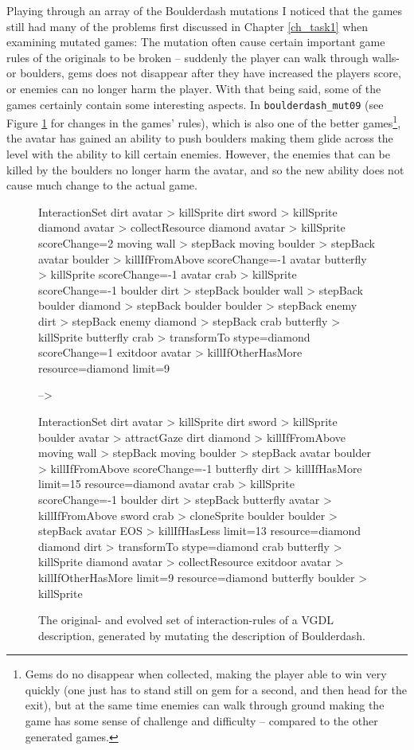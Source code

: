 \documentclass[a4paper,titlepage,final]{report}
\begin{document}
Playing through an array of the Boulderdash mutations I noticed that the games still had many of the problems first discussed in Chapter \ref{ch_task1} when examining mutated games:
The mutation often cause certain important game rules of the originals to be broken -- suddenly the player can walk through walls- or boulders, gems does not disappear after they have increased the players score, or enemies can no longer harm the player.
With that being said, some of the games certainly contain some interesting aspects.
In \texttt{boulderdash_mut09} (see Figure \ref{fig:evolved_boulderdash} for changes in the games' rules), which is also one of the better games\footnote{Gems do no disappear when collected, making the player able to win very quickly (one just has to stand still on gem for a second, and then head for the exit), but at the same time enemies can walk through ground making the game has some sense of challenge and difficulty -- compared to the other generated games.}, the avatar has gained an ability to push boulders making them glide across the level with the ability to kill certain enemies.
However, the enemies that can be killed by the boulders no longer harm the avatar, and so the new ability does not cause much change to the actual game.

\begin{figure}[!ht]
\centering
\begin{vgdldesc}[linewidth=14cm]
InteractionSet
	dirt avatar > killSprite									
	dirt sword  > killSprite
	diamond avatar > collectResource
	diamond avatar > killSprite scoreChange=2
	moving wall > stepBack
	moving boulder > stepBack
	avatar boulder > killIfFromAbove scoreChange=-1
	avatar butterfly > killSprite scoreChange=-1
	avatar crab > killSprite scoreChange=-1
	boulder dirt > stepBack
	boulder wall > stepBack
	boulder diamond > stepBack
	boulder boulder > stepBack
	enemy dirt > stepBack
	enemy diamond > stepBack
	crab butterfly > killSprite
	butterfly crab > transformTo stype=diamond scoreChange=1
	exitdoor avatar > killIfOtherHasMore resource=diamond limit=9
	
	-->
	
InteractionSet	
	dirt avatar > killSprite
	dirt sword > killSprite
	boulder avatar > attractGaze
	dirt diamond > killIfFromAbove
	moving wall > stepBack
	moving boulder > stepBack
	avatar boulder > killIfFromAbove scoreChange=-1
	butterfly dirt > killIfHasMore limit=15 resource=diamond
	avatar crab > killSprite scoreChange=-1
	boulder dirt > stepBack
	butterfly avatar > killIfFromAbove
	sword crab > cloneSprite
	boulder boulder > stepBack
	avatar EOS > killIfHasLess limit=13 resource=diamond
	diamond dirt > transformTo stype=diamond
	crab butterfly > killSprite
	diamond avatar > collectResource
	exitdoor avatar > killIfOtherHasMore limit=9 resource=diamond
	butterfly boulder > killSprite
\end{vgdldesc}
\caption{The original- and evolved set of interaction-rules of a VGDL description, generated by mutating the description of Boulderdash.}
\label{fig:evolved_boulderdash}
\end{figure}
\end{document}
